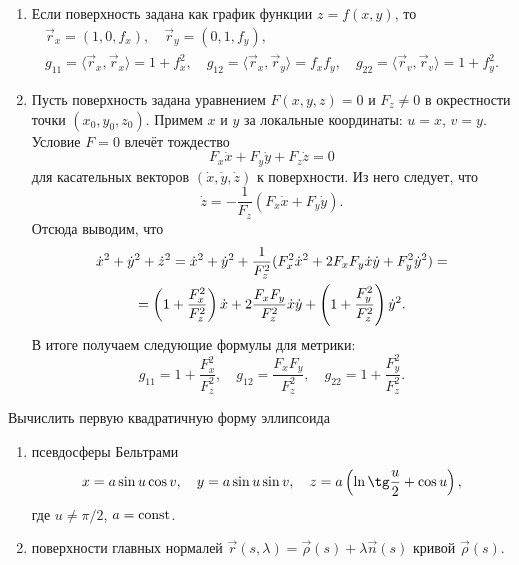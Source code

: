 \begin{example}
	\begin{enumerate}[nolistsep, label=(\arabic*)]
		\item Если поверхность задана как график функции $z = f(x, y)$, то
			\begin{gather*}
				\vec{r}_x = (1, 0, f_x),\quad\vec{r}_y = (0, 1, f_y),\\
				g_{11} = \langle\vec{r}_x, \vec{r}_x\rangle = 1 + f_x^2,\quad g_{12} = \langle\vec{r}_x, \vec{r}_y\rangle = f_xf_y,\quad g_{22} = \langle\vec{r}_v, \vec{r}_v\rangle = 1 + f_y^2.
			\end{gather*}
		\item Пусть поверхность задана уравнением $F(x, y, z) = 0$ и $F_z \ne 0$ в окрестности точки $(x_0, y_0, z_0)$. Примем $x$ и $y$ за локальные координаты: $u = x$, $v = y$. Условие $F = 0$ влечёт тождество
			\[
				F_x\dot{x} + F_y\dot{y} + F_z\dot{z} = 0
			\]
			для касательных векторов $(\dot{x}, \dot{y}, \dot{z})$ к поверхности. Из него следует, что
			\[
				\dot{z} = -\frac{1}{F_z}(F_x\dot{x} + F_y\dot{y}).
			\]
			Отсюда выводим, что
			\begin{multline*}
				\dot{x}^2 + \dot{y}^2 + \dot{z}^2 = \dot{x}^2 + \dot{y}^2 + \frac{1}{F_z^2}(F_x^2\dot{x}^2 + 2F_xF_y\dot{x}\dot{y} + F_y^2\dot{y}^2) =\\ = \left(1 + \frac{F_x^2}{F_z^2}\right)\dot{x} + 2\frac{F_xF_y}{F_z^2}\dot{x}\dot{y} + \left(1 + \frac{F_y^2}{F_z^2}\right)\dot{y}^2.
			\end{multline*}
			В итоге получаем следующие формулы для метрики:
			\[
				g_{11} = 1 + \frac{F_x^2}{F_z^2},\quad g_{12} = \frac{F_xF_y}{F_z^2},\quad g_{22} = 1 + \frac{F_y^2}{F_z^2}.
			\]
	\end{enumerate}
\end{example}

\begin{problem}
	Вычислить первую квадратичную форму эллипсоида
	\begin{enumerate}[nolistsep, label=(\arabic*)]
		\item псевдосферы Бельтрами
			\[
				x = a\sin u\cos v,\quad y = a\sin u\sin v,\quad z = a\br{\ln\tg\frac{u}{2} + \cos u},
			\]
			где $u \ne \pi / 2$, $a = \mathrm{const}$.
		\item поверхности главных нормалей $\vec{r}(s, \lambda) = \vec{\rho}(s) + \lambda\vec{n}(s)$ кривой $\vec{\rho}(s)$.
	\end{enumerate}
\end{problem}

